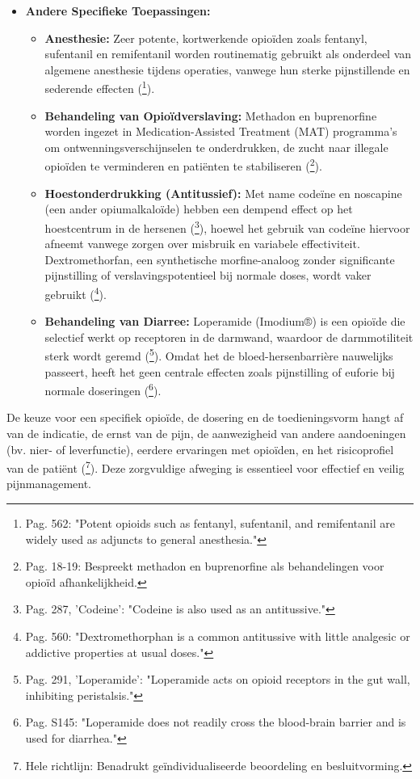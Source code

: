 \documentclass[11pt, a4paper]{report} %
\begin{document}
\begin{itemize}
    \item \textbf{Andere Specifieke Toepassingen:}
        \begin{itemize}
            \item \textbf{Anesthesie:} Zeer potente, kortwerkende opioïden zoals fentanyl, sufentanil en remifentanil worden routinematig gebruikt als onderdeel van algemene anesthesie tijdens operaties, vanwege hun sterke pijnstillende en sederende effecten (\cite{GutsteinAkil2006OpioidAnalgesics}\footnote{Pag. 562: "Potent opioids such as fentanyl, sufentanil, and remifentanil are widely used as adjuncts to general anesthesia."}).
            \item \textbf{Behandeling van Opioïdverslaving:} Methadon en buprenorfine worden ingezet in Medication-Assisted Treatment (MAT) programma's om ontwenningsverschijnselen te onderdrukken, de zucht naar illegale opioïden te verminderen en patiënten te stabiliseren (\cite{Kosten2002NeurobiologyDependence}\footnote{Pag. 18-19: Bespreekt methadon en buprenorfine als behandelingen voor opioïd afhankelijkheid.}).
            \item \textbf{Hoestonderdrukking (Antitussief):} Met name codeïne en noscapine (een ander opiumalkaloïde) hebben een dempend effect op het hoestcentrum in de hersenen (\cite{Gupta2010ChemistryOpioids}\footnote{Pag. 287, 'Codeine': "Codeine is also used as an antitussive."}), hoewel het gebruik van codeïne hiervoor afneemt vanwege zorgen over misbruik en variabele effectiviteit. Dextromethorfan, een synthetische morfine-analoog zonder significante pijnstilling of verslavingspotentieel bij normale doses, wordt vaker gebruikt (\cite{GutsteinAkil2006OpioidAnalgesics}\footnote{Pag. 560: "Dextromethorphan is a common antitussive with little analgesic or addictive properties at usual doses."}).
            \item \textbf{Behandeling van Diarree:} Loperamide (Imodium®) is een opioïde die selectief werkt op receptoren in de darmwand, waardoor de darmmotiliteit sterk wordt geremd (\cite{Gupta2010ChemistryOpioids}\footnote{Pag. 291, 'Loperamide': "Loperamide acts on opioid receptors in the gut wall, inhibiting peristalsis."}). Omdat het de bloed-hersenbarrière nauwelijks passeert, heeft het geen centrale effecten zoals pijnstilling of euforie bij normale doseringen (\cite{Trescot2008OpioidPharm}\footnote{Pag. S145: "Loperamide does not readily cross the blood-brain barrier and is used for diarrhea."}).
        \end{itemize}
\end{itemize}
De keuze voor een specifiek opioïde, de dosering en de toedieningsvorm hangt af van de indicatie, de ernst van de pijn, de aanwezigheid van andere aandoeningen (bv. nier- of leverfunctie), eerdere ervaringen met opioïden, en het risicoprofiel van de patiënt (\cite{Dowell2016CDCGuideline}\footnote{Hele richtlijn: Benadrukt geïndividualiseerde beoordeling en besluitvorming.}). Deze zorgvuldige afweging is essentieel voor effectief en veilig pijnmanagement.
\end{document}

